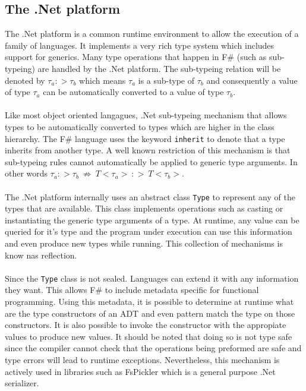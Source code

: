 \documentclass{sigplanconf}
\begin{document}
\subsection{The .Net platform}
The .Net platform is a common runtime environment to allow the execution of a family of languages. It implements a very rich type system which includes support for generics. Many type operations that happen in F\# (such as sub-typeing) are handled by the .Net platform. The sub-typeing relation will be denoted by $\tau_a :> \tau_b$ which means $\tau_a$ is a sub-type of $\tau_b$ and consequently a value of type $\tau_a$ can be automatically converted to a value of type $\tau_b$.
\\\\
Like most object oriented langagues, .Net sub-typeing mechanism that allows types to be automatically converted to types which are higher in the class hierarchy. The F\# language uses the keyword \verb+inherit+ to denote that a type inherits from another type. A well known restriction of this mechanism is that sub-typeing rules cannot automatically be applied to generic type arguments. In other words $\tau_a :> \tau_b\ \not\Rightarrow\ T<\tau_a> \ :> \ T<\tau_b>$.
\\\\
The .Net platform internally uses an abstract class \verb+Type+ to represent any of the types that are available. This class implements operations such as casting or instantiating the generic type arguments of a type. At runtime, any value can be queried for it's type and the program under execution can use this information and even produce new types while running. This collection of mechanisms is know nas reflection.
\\\\
Since the \verb+Type+ class is not sealed. Languages can extend it with any information they want. This allows F\# to include metadata specific for functional programming. Using this metadata, it is possible to determine at runtime what are the type constructors of an ADT and even pattern match the type on those constructors. It is also possible to invoke the constructor with the appropiate values to produce new values. It should be noted that doing so is not type safe since the compiler cannot check that the operations being preformed are safe and type errors will lead to runtime exceptions. Nevertheless, this mechanism is actively used in libraries such as FsPickler \cite{FsPickler} which is a general purpose .Net serializer.
\end{document}
